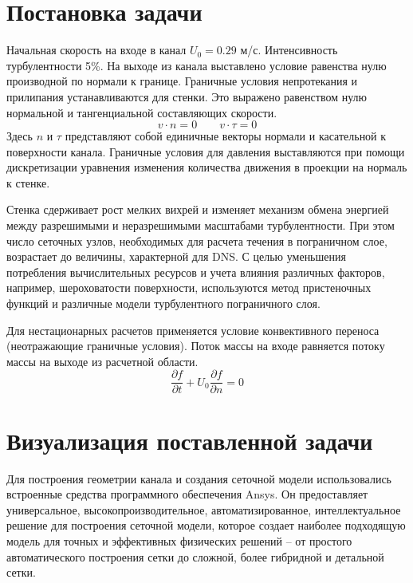 \section{Постановка задачи}
	Начальная скорость на входе в канал $U_0 = 0.29$ м/с. Интенсивность турбулентности 5\%. На выходе из канала выставлено условие равенства нулю производной по нормали к границе. Граничные условия непротекания и прилипания устанавливаются для стенки. Это выражено равенством нулю нормальной и тангенциальной составляющих скорости.
	\begin{equation}
		v \cdot n = 0 \qquad v \cdot \tau = 0
	\end{equation}
	Здесь $n$ и $\tau$ представляют собой единичные векторы нормали и касательной к поверхности канала. Граничные условия для давления выставляются при помощи дискретизации уравнения изменения количества движения в проекции на нормаль к стенке.
	
	Стенка сдерживает рост мелких вихрей и изменяет механизм обмена энергией между разрешимыми и неразрешимыми масштабами турбулентности. При этом число сеточных узлов, необходимых для расчета течения в пограничном слое, возрастает до величины, характерной для DNS. С целью уменьшения потребления вычислительных ресурсов и учета влияния различных факторов, например, шероховатости поверхности, используются метод пристеночных функций и различные модели турбулентного пограничного слоя\cite{Cabot2000}.
	
	Для нестационарных расчетов применяется условие конвективного переноса (неотражающие граничные условия). Поток массы на входе равняется потоку массы на выходе из расчетной области.
	\begin{equation}
		\frac{\partial f}{\partial t} + U_0\frac{\partial f}{\partial n} = 0
	\end{equation}

\section{Визуализация поставленной задачи}
	Для построения геометрии канала и создания сеточной модели использовались встроенные средства программного обеспечения Ansys. Он предоставляет универсальное, высокопроизводительное, автоматизированное, интеллектуальное решение для построения сеточной модели, которое создает наиболее подходящую модель для точных и эффективных физических решений -- от простого автоматического построения сетки до сложной, более гибридной и детальной сетки.
